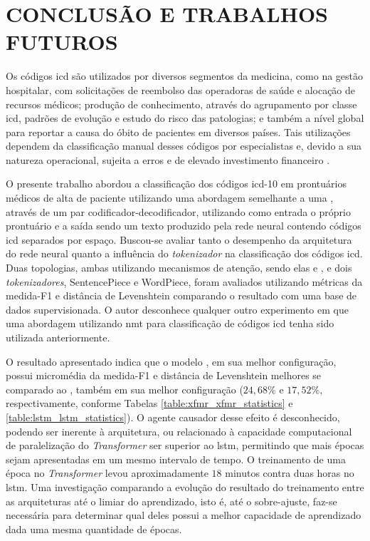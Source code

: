 \chapter{CONCLUSÃO E TRABALHOS FUTUROS}
\label{chp:conclusão}

Os códigos \gls{icd} são utilizados por diversos segmentos da medicina, como na gestão hospitalar, com solicitações de reembolso das operadoras de saúde e alocação de recursos médicos; produção de conhecimento, através do agrupamento por classe \gls{icd}, padrões de evolução e estudo do risco das patologias; e também a nível global para reportar a causa do óbito de pacientes em diversos países. Tais utilizações dependem da classificação manual desses códigos por especialistas e, devido a sua natureza operacional, sujeita a erros e de elevado investimento financeiro \cite{Xie2018ANeuralArchitecture}. 

O presente trabalho abordou a classificação dos códigos \gls{icd}-10 em prontuários médicos de alta de paciente utilizando uma abordagem semelhante a uma , através de um par codificador-decodificador, utilizando como entrada o próprio prontuário e a saída sendo um texto produzido pela rede neural contendo códigos \gls{icd} separados por espaço. Buscou-se avaliar tanto o desempenho da arquitetura do rede neural quanto a influência do \textit{tokenizador} na classificação dos códigos \gls{icd}. Duas topologias, ambas utilizando mecanismos de atenção, sendo elas \xfmrxfmr{} e \lstmlstm{}, e dois \textit{tokenizadores}, SentencePiece e WordPiece, foram avaliados utilizando métricas da medida-F1 e distância de Levenshtein comparando o resultado com uma base de dados supervisionada. O autor desconhece qualquer outro experimento em que uma abordagem utilizando \gls{nmt} para classificação de códigos \gls{icd} tenha sido utilizada anteriormente.

O resultado apresentado indica que o modelo \xfmrxfmr, em sua melhor configuração, possui micromédia da medida-F1 e distância de Levenshtein melhores se comparado ao \lstmlstm, também em sua melhor configuração ($24,68\%$ e $17,52\%$, respectivamente, conforme Tabelas \ref{table:xfmr_xfmr_statistics} e \ref{table:lstm_lstm_statistics}). O agente causador desse efeito é desconhecido, podendo ser inerente à arquitetura, ou relacionado à capacidade computacional de paralelização do \textit{Transformer} ser superior ao \gls{lstm}, permitindo que mais épocas sejam apresentadas em um mesmo intervalo de tempo. O treinamento de uma época no \textit{Transformer} levou aproximadamente $18$ minutos contra duas horas no \gls{lstm}. Uma investigação comparando a evolução do resultado do treinamento entre as arquiteturas até o limiar do aprendizado, isto é, até o sobre-ajuste, faz-se necessária para determinar qual deles possui a melhor capacidade de aprendizado dada uma mesma quantidade de épocas. 

